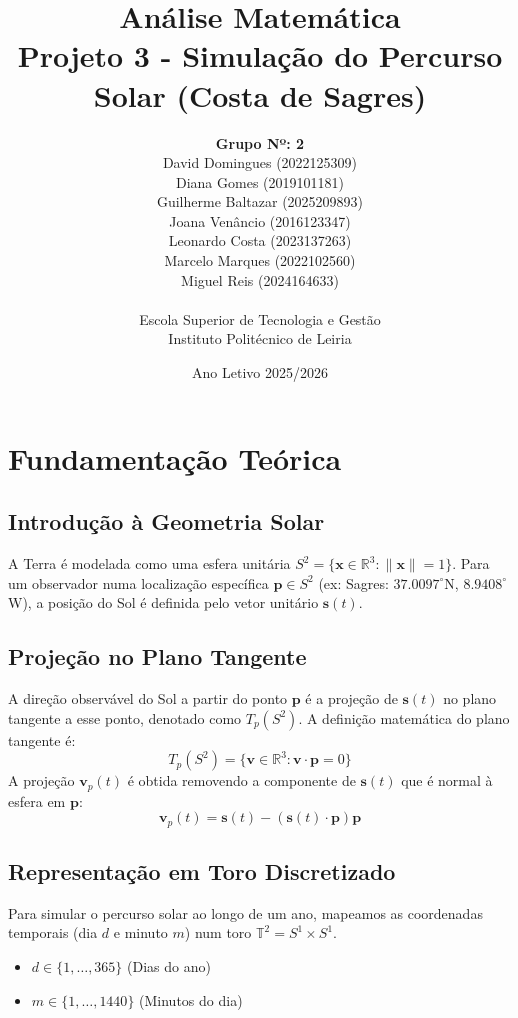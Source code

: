 \documentclass[12pt,a4paper]{report}
\title{Análise Matemática \\ \Large Projeto 3 - Simulação do Percurso Solar (Costa de Sagres)}
\author{
    \textbf{Grupo Nº: 2} \\    
    David Domingues (2022125309) \\
    Diana Gomes (2019101181) \\
    Guilherme Baltazar (2025209893) \\
    Joana Venâncio (2016123347) \\
    Leonardo Costa (2023137263) \\
    Marcelo Marques (2022102560) \\
    Miguel Reis (2024164633) \\ \\
    Escola Superior de Tecnologia e Gestão \\
    Instituto Politécnico de Leiria
}\date{Ano Letivo 2025/2026}
\begin{document}
\maketitle

\tableofcontents

\chapter{Fundamentação Teórica}

\section{Introdução à Geometria Solar}
A Terra é modelada como uma esfera unitária $S^2 = \{ \mathbf{x} \in \mathbb{R}^3 : \|\mathbf{x}\| = 1 \}$. Para um observador numa localização específica $\mathbf{p} \in S^2$ (ex: Sagres: $37.0097^\circ$N, $8.9408^\circ$W), a posição do Sol é definida pelo vetor unitário $\mathbf{s}(t)$.

\section{Projeção no Plano Tangente}
A direção observável do Sol a partir do ponto $\mathbf{p}$ é a projeção de $\mathbf{s}(t)$ no plano tangente a esse ponto, denotado como $T_p(S^2)$. 
A definição matemática do plano tangente é:
\begin{equation}
T_p(S^2) = \{ \mathbf{v} \in \mathbb{R}^3 : \mathbf{v} \cdot \mathbf{p} = 0 \}
\end{equation}
A projeção $\mathbf{v}_p(t)$ é obtida removendo a componente de $\mathbf{s}(t)$ que é normal à esfera em $\mathbf{p}$:
\begin{equation}
\mathbf{v}_p(t) = \mathbf{s}(t) - (\mathbf{s}(t) \cdot \mathbf{p}) \mathbf{p}
\end{equation}

\section{Representação em Toro Discretizado}
Para simular o percurso solar ao longo de um ano, mapeamos as coordenadas temporais (dia $d$ e minuto $m$) num toro $\mathbb{T}^2 = S^1 \times S^1$.
\begin{itemize}
    \item $d \in \{1, \dots, 365\}$ (Dias do ano)
    \item $m \in \{1, \dots, 1440\}$ (Minutos do dia)
\end{itemize}
\end{document}
